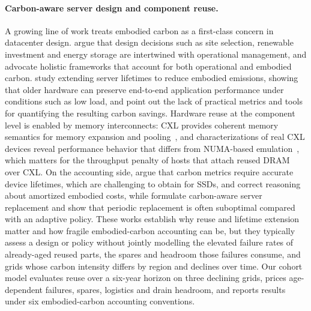 \documentclass{article} %
\begin{document}
\paragraph{Carbon-aware server design and component reuse.}
A growing line of work treats embodied carbon as a first-class concern in datacenter design. \citet{Acun2023CarbonDependencies} argue that design decisions such as site selection, renewable investment and energy storage are intertwined with operational management, and advocate holistic frameworks that account for both operational and embodied carbon. \citet{Wang2023PeelingBack} study extending server lifetimes to reduce embodied emissions, showing that older hardware can preserve end-to-end application performance under conditions such as low load, and point out the lack of practical metrics and tools for quantifying the resulting carbon savings. Hardware reuse at the component level is enabled by memory interconnects: CXL provides coherent memory semantics for memory expansion and pooling~\citep{Sharma2024IntroductionCompute}, and characterizations of real CXL devices reveal performance behavior that differs from NUMA-based emulation~\citep{Sun2023DemystifyingCxl}, which matters for the throughput penalty of hosts that attach reused DRAM over CXL. On the accounting side, \citet{Huang2025CaseAccurate} argue that carbon metrics require accurate device lifetimes, which are challenging to obtain for SSDs, and correct reasoning about amortized embodied costs, while \citet{Sharma2025TowardOptimal} formulate carbon-aware server replacement and show that periodic replacement is often suboptimal compared with an adaptive policy. These works establish why reuse and lifetime extension matter and how fragile embodied-carbon accounting can be, but they typically assess a design or policy without jointly modelling the elevated failure rates of already-aged reused parts, the spares and headroom those failures consume, and grids whose carbon intensity differs by region and declines over time. Our cohort model evaluates reuse over a six-year horizon on three declining grids, prices age-dependent failures, spares, logistics and drain headroom, and reports results under six embodied-carbon accounting conventions.
\end{document}
